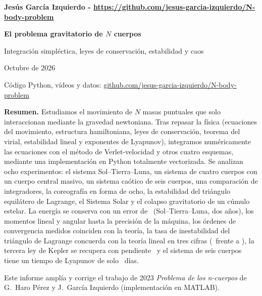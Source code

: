 \documentclass[11pt,a4paper]{article}
\newcommand{\repo}{\href{https://github.com/jesus-garcia-izquierdo/N-body-problem}{github.com/jesus-garcia-izquierdo/N-body-problem}}
\begin{document}
\begin{titlepage}
\centering
\vspace*{2.5cm}
{\Large\bfseries Jesús García Izquierdo - {\hypersetup{urlcolor=black}\url{https://github.com/jesus-garcia-izquierdo/N-body-problem}}\par}
\vspace{0.6cm}
{\LARGE\bfseries El problema gravitatorio de $N$ cuerpos\par}
\vspace{0.25cm}
{\large Integración simpléctica, leyes de conservación, estabilidad y caos\par}
\vspace{1.5cm}
{\normalsize Octubre de 2026\par}
\vspace{1.2cm}
{\small Código Python, vídeos y datos: \repo\par}
\vspace{2cm}
\begin{minipage}{0.86\textwidth}
\small
\textbf{Resumen.} Estudiamos el movimiento de $N$ masas puntuales que solo interaccionan
mediante la gravedad newtoniana. Tras repasar la física (ecuaciones del movimiento,
estructura hamiltoniana, leyes de conservación, teorema del virial, estabilidad lineal y
exponentes de Lyapunov), integramos numéricamente las ecuaciones con el método de
Verlet-velocidad y otros cuatro esquemas, mediante una implementación en Python
totalmente vectorizada. Se analizan ocho experimentos: el sistema Sol--Tierra--Luna, un
sistema de cuatro cuerpos con un cuerpo central masivo, un sistema caótico de seis
cuerpos, una comparación de integradores, la coreografía en forma de ocho, la estabilidad
del triángulo equilátero de Lagrange, el Sistema Solar y el colapso gravitatorio de un
cúmulo estelar. La energía se conserva con un error de \SemErrE\ (Sol--Tierra--Luna, dos
años), los momentos lineal y angular hasta la precisión de la máquina, los órdenes de
convergencia medidos coinciden con la teoría, la tasa de inestabilidad del triángulo de
Lagrange concuerda con la teoría lineal en tres cifras (\LagSigma\ frente a
\LagSigmaTh), la tercera ley de Kepler se recupera con pendiente \SolarSlope\ y el
sistema de seis cuerpos tiene un tiempo de Lyapunov de solo \ChaosLyapDays\ días.
\end{minipage}
\vfill
{\footnotesize Este informe amplía y corrige el trabajo de 2023
\emph{Problema de los n-cuerpos} de G.~Haro Pérez y J.~García Izquierdo
(implementación en MATLAB).\par}
\end{titlepage}
\end{document}
